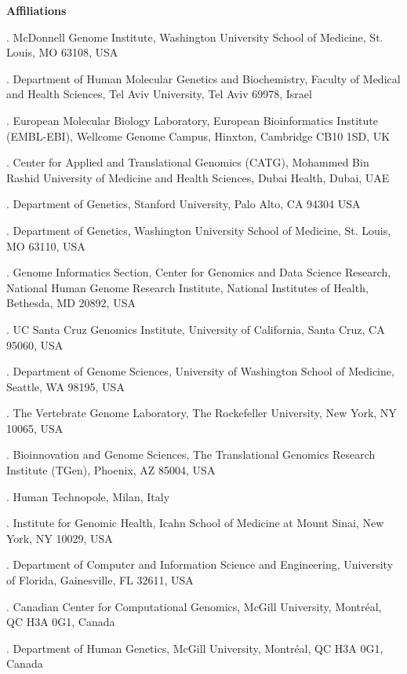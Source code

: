 \documentclass[pdflatex,mathphys]{jnl}
\begin{document}
\bigskip
{\footnotesize
\noindent\textbf{Affiliations}\par
{}. McDonnell Genome Institute, Washington University School of Medicine, St. Louis, MO 63108, USA\par
{}. Department of Human Molecular Genetics and Biochemistry, Faculty of Medical and Health Sciences, Tel Aviv University, Tel Aviv 69978, Israel\par
{}. European Molecular Biology Laboratory, European Bioinformatics Institute (EMBL-EBI), Wellcome Genome Campus, Hinxton, Cambridge CB10 1SD, UK\par
{}. Center for Applied and Translational Genomics (CATG), Mohammed Bin Rashid University of Medicine and Health Sciences, Dubai Health, Dubai, UAE\par
{}. Department of Genetics, Stanford University, Palo Alto, CA 94304 USA\par
{}. Department of Genetics, Washington University School of Medicine, St. Louis, MO 63110, USA\par
{}. Genome Informatics Section, Center for Genomics and Data Science Research, National Human Genome Research Institute, National Institutes of Health, Bethesda, MD 20892, USA\par
{}. UC Santa Cruz Genomics Institute, University of California, Santa Cruz, CA 95060, USA\par
{}. Department of Genome Sciences, University of Washington School of Medicine, Seattle, WA 98195, USA\par
{}. The Vertebrate Genome Laboratory, The Rockefeller University, New York, NY 10065, USA\par
{}. Bioinnovation and Genome Sciences, The Translational Genomics Research Institute (TGen), Phoenix, AZ 85004, USA\par
{}. Human Technopole, Milan, Italy\par
{}. Institute for Genomic Health, Icahn School of Medicine at Mount Sinai, New York, NY 10029, USA\par
{}. Department of Computer and Information Science and Engineering, University of Florida, Gainesville, FL 32611, USA\par
{}. Canadian Center for Computational Genomics, McGill University, Montr\'eal, QC H3A 0G1, Canada\par
{}. Department of Human Genetics, McGill University, Montr\'eal, QC H3A 0G1, Canada\par
}
\end{document}
